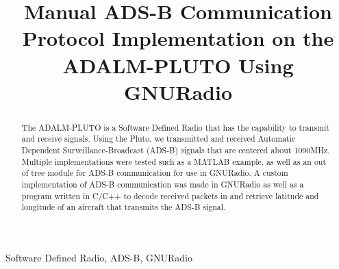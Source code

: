 \documentclass[conference, onecolumn]{IEEEtran}
\begin{document}
\title{Manual ADS-B Communication Protocol Implementation on the ADALM-PLUTO Using GNURadio}

\author{
\and
}

\maketitle

\begin{IEEEkeywords}
  Software Defined Radio, ADS-B, GNURadio
\end{IEEEkeywords}

\begin{abstract}
  The ADALM-PLUTO is a Software Defined Radio that has the capability to transmit and receive signals. Using the Pluto, we transmitted and received Automatic Dependent Surveillance-Broadcast (ADS-B) signals that are centered about 1090MHz. Multiple implementations were tested such as a MATLAB example, as well as an out of tree module for ADS-B communication for use in GNURadio. A custom implementation of ADS-B communication was made in GNURadio as well as a program written in C/C++ to decode received packets in and retrieve latitude and longitude of an aircraft that transmits the ADS-B signal.
\end{abstract}
\end{document}
